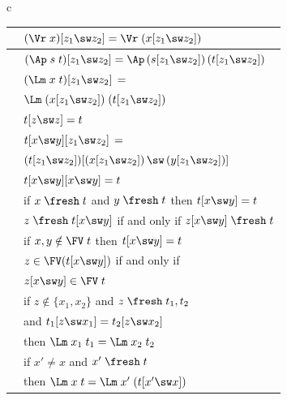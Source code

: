 \thispagestyle{empty}
\begin{figure}%
\hspace*{-1.9ex}
{\small
\begin{tabular}{c} 
\begin{tabular}{|c|l|}	
	\hline
\textrm{\SwVr} 
&
$(\Vr\;x)[z_1 \sw z_2] = \Vr\;(x[z_1 \sw z_2])$
\\\hline	
\textrm{\SwAp} 
&
$(\Ap\;s\;t)[z_1 \sw z_2] = \Ap\,(s[z_1 \sw z_2])\,(t[z_1 \sw z_2])$
\\\hline 	
\textrm{\SwLm}
&
$(\Lm\;x\;t)[z_1 \sw z_2] \,= $
\\&
$ \Lm\;(x[z_1 \sw z_2])\;(t[z_1 \sw z_2])$
\\\hline
	\textrm{\SwId}
&
$t[z\sw z] = t$
\\\hline
\textrm{\SwCp} 
&
$t[x\sw y][z_1\sw z_2] \,=$ 
\\
&
$(t[z_1\sw z_2]) [(x[z_1\sw z_2])\,\sw\, (y[z_1\sw z_2])]$
\\\hline
\textrm{\SwIv} 
&
$t[x\sw y][x\sw y] = t$
\\\hline
	\textrm{\SwFr} 
&
if $x \;\fresh\;t$ and $y \;\fresh\;t$ 
then $t[x\sw y] = t$
\\\hline 
\textrm{\FrSw} 
&
$z \;\fresh\;t [x\sw y]$ if and only if    
$z[x\sw y] \;\fresh\;t$
\\\hline 
	\textrm{\SwFv} 
&
if $x,y \notin \FV\;t$ then $t[x\sw y] = t$
\\\hline 
\textrm{\FvSw} 
&
$z \in \FV(t [x\sw y])$ if and only if   
\\&
$z[x\sw y] \in \FV\;t$
\\\hline 
\textrm{\SwCg} 
&
if $z \not\in \{x_1,x_2\}$ and 
$z\;\fresh\;t_1,t_2$ 
\\
&and 
$t_1[z\sw x_1] = t_2[z\sw x_2]$ 
\\
&then $\Lm\;x_1\;t_1 = \Lm\;x_2\;t_2$
\\\hline
\textrm{\SwBvr} 
&
if $x' \not= x$ and 
$x'\;\fresh\;t$ 
\\&then 
$\Lm\;x\;t = \Lm\;x'\;(t[x' \sw x])$
\\\hline
\end{tabular} 	
\\ \\  \vspace*{-1.3ex}
\begin{tabular}{|c|l|}	

\end{tabular}
\end{tabular}}
\end{figure}
